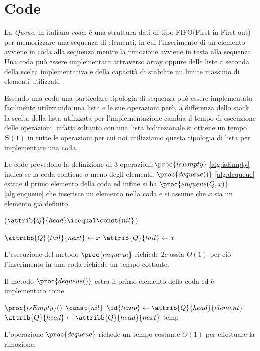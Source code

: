 \section{Code}
La \emph{Queue}, in italiano \emph{coda}, è una struttura dati di tipo FIFO(First in First out) per memorizzare una sequenza di elementi,
in cui l'inserimento di un elemento avviene in coda alla sequenza mentre la rimozione avviene in testa alla sequenza.\newline
Una coda può essere implementata attraverso array oppure delle liste a seconda della scelta implementativa e della capacità di stabilire un limite massimo di elementi utilizzati.

Essendo una coda una particolare tipologia di sequenza può essere implementata facilmente utilizzando una lista e le sue operazioni però,
a differenza dello stack, la scelta della lista utilizzata per l'implementazione cambia il tempo di esecuzione delle operazioni,
infatti soltanto con una lista bidirezionale si ottiene un tempo $\Theta(1)$ in tutte le operazioni per cui noi utilizziamo questa tipologia di lista per implementare una coda.

Le code prevedono la definizione di 3 operazioni:$\proc{isEmpty}$ \ref{alg:isEmpty} indica se la coda contiene o meno degli elementi, $\proc{dequeue()}$ \ref{alg:dequeue}
estrae il primo elemento della coda ed infine si ha $\proc{enqueue(Q, x)}$ \ref{alg:enqueue} che inserisce un elemento nella coda e si assume che $x$ sia un elemento già definito.

\begin{codebox}
\li \Return ($\attrib{Q}{head} \isequal \const{nil}$)
\end{codebox}
\begin{codebox}
\li $\attribb{Q}{tail}{next} \gets x$
\li $\attrib{Q}{tail} \gets x$
\end{codebox}
L'esecuzione del metodo $\proc{enqueue}$ richiede $2c$ ossia $\Theta(1)$ per ciò
l'inserimento in una coda richiede un tempo costante.

Il metodo $\proc{dequeue()}$ estra il primo elemento della coda ed è implementato come
\begin{codebox}
\li \If $\proc{isEmpty}()$
    \Then
\li           \Return $\const{nil}$
\li $\id{temp} \gets \attrib{Q}{head}{element}$
\li $\attrib{Q}{head} \gets \attribb{Q}{head}{next}$
\li \Return temp
\end{codebox}
L'operazione $\proc{dequeue}$ richede un tempo costante $\Theta(1)$ per effettuare la rimozione.

